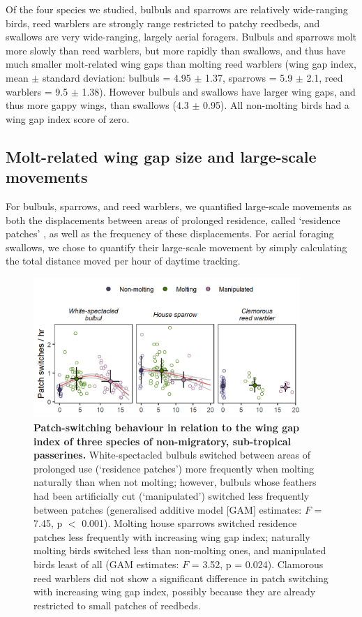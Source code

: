 \begin{refsection}
Of the four species we studied, bulbuls and sparrows are relatively wide-ranging birds, reed warblers are strongly range restricted to patchy reedbeds, and swallows are very wide-ranging, largely aerial foragers.
Bulbuls and sparrows molt more slowly than reed warblers, but more rapidly than swallows, and thus have much smaller molt-related wing gaps than molting reed warblers {(wing gap index, mean $\pm$ standard deviation: bulbuls = 4.95 $\pm$ 1.37, sparrows = 5.9 $\pm$ 2.1, reed warblers = 9.5 $\pm$ 1.38)}.
However bulbuls and swallows have larger wing gaps, and thus more gappy wings, than swallows (4.3 $\pm$ 0.95).
All non-molting birds had a wing gap index score of zero.

\subsection*{Molt-related wing gap size and large-scale movements}

For bulbuls, sparrows, and reed warblers, we quantified large-scale movements as both the displacements between areas of prolonged residence, called `residence patches' \cite{gupte2022d}, as well as the frequency of these displacements.
For aerial foraging swallows, we chose to quantify their large-scale movement by simply calculating the total distance moved per hour of daytime tracking.

\begin{figure}%
    \centering
    \includegraphics[width=0.9\textwidth]{figures/holeybirds/fig_01.png}
    \caption{
        \textbf{Patch-switching behaviour in relation to the wing gap index of three species of non-migratory, sub-tropical passerines.}
        White-spectacled bulbuls switched between areas of prolonged use (`residence patches') more frequently when molting naturally than when not molting; however, bulbuls whose feathers had been artificially cut (`manipulated') switched less frequently between patches (generalised additive model [GAM] estimates: $F$ = 7.45, p $<$ 0.001).
        Molting house sparrows switched residence patches less frequently with increasing wing gap index; naturally molting birds switched less than non-molting ones, and manipulated birds least of all (GAM estimates: $F$ = 3.52, p = 0.024).
        Clamorous reed warblers did not show a significant difference in patch switching with increasing wing gap index, possibly because they are already restricted to small patches of reedbeds.
    }\label{fig_holey_02}
\end{figure}


\end{refsection}
